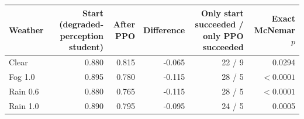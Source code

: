 \begin{tabular}{@{}lrrrrr@{}}\toprule
Weather & Start (degraded-perception student) & After PPO & Difference & Only start succeeded / only PPO succeeded & Exact McNemar $p$\\\midrule
Clear & 0.880 & 0.815 & -0.065 & 22 / 9 & 0.0294\\
Fog 1.0 & 0.895 & 0.780 & -0.115 & 28 / 5 & $<0.0001$\\
Rain 0.6 & 0.880 & 0.765 & -0.115 & 28 / 5 & $<0.0001$\\
Rain 1.0 & 0.890 & 0.795 & -0.095 & 24 / 5 & 0.0005\\
\bottomrule\end{tabular}
